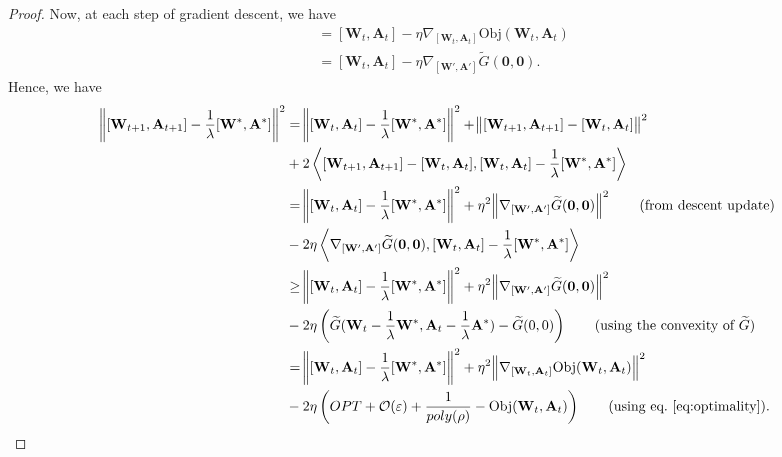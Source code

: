 \begin{proof}
	Now, at each step of gradient descent, we have
	\begin{align*}
		[\mathbf{W}_{t+1}, \mathbf{A}_{t+1}] &= [\mathbf{W}_{t}, \mathbf{A}_{t}] - \eta \nabla_{[\mathbf{W}_{t}, \mathbf{A}_{t}]} \mathrm{Obj}(\mathbf{W}_{t}, \mathbf{A}_{t}) \\&
		= [\mathbf{W}_{t}, \mathbf{A}_{t}] - \eta \nabla_{[\mathbf{W}', \mathbf{A}']} \widetilde{G}(\mathbf{0}, \mathbf{0}) \tag{using the equivalence between gradient derived above}. 
	\end{align*}
	Hence, we have
	\begin{align*}
		\norm{[\mathbf{W}_{t+1}, \mathbf{A}_{t+1}] - \frac{1}{\lambda}[\mathbf{W}^{\ast}, \mathbf{A}^{\ast}]}^2 &= \norm{[\mathbf{W}_{t}, \mathbf{A}_{t}] - \frac{1}{\lambda}[\mathbf{W}^{\ast}, \mathbf{A}^{\ast}]}^2 + \norm{[\mathbf{W}_{t+1}, \mathbf{A}_{t+1}] - [\mathbf{W}_t, \mathbf{A}_t]}^2 \\&+ 2 \left\langle [\mathbf{W}_{t+1}, \mathbf{A}_{t+1}] - [\mathbf{W}_t, \mathbf{A}_t],  [\mathbf{W}_{t}, \mathbf{A}_{t}] - \frac{1}{\lambda}[\mathbf{W}^{\ast}, \mathbf{A}^{\ast}] \right\rangle \\&
		=  \norm{[\mathbf{W}_{t}, \mathbf{A}_{t}] - \frac{1}{\lambda}[\mathbf{W}^{\ast}, \mathbf{A}^{\ast}]}^2 + \eta^2 \norm{\nabla_{[\mathbf{W}', \mathbf{A}']} \widetilde{G}(\mathbf{0}, \mathbf{0})}^2 \tag{from descent update}
		\\& - 2\eta \left\langle\nabla_{[\mathbf{W}', \mathbf{A}']} \widetilde{G}(\mathbf{0}, \mathbf{0}),  [\mathbf{W}_{t}, \mathbf{A}_{t}] - \frac{1}{\lambda}[\mathbf{W}^{\ast}, \mathbf{A}^{\ast}] \right\rangle \\&
		\ge \norm{[\mathbf{W}_{t}, \mathbf{A}_{t}] - \frac{1}{\lambda}[\mathbf{W}^{\ast}, \mathbf{A}^{\ast}]}^2 + \eta^2 \norm{\nabla_{[\mathbf{W}', \mathbf{A}']} \widetilde{G}(\mathbf{0}, \mathbf{0})}^2 \\& - 2\eta \left(\widetilde{G}(\mathbf{W}_t - \frac{1}{\lambda} \mathbf{W}^{\ast}, \mathbf{A}_t - \frac{1}{\lambda} \mathbf{A}^{\ast}) - \widetilde{G}(0, 0)\right) 
		\tag{using the convexity of $\widetilde{G}$}\\&
		= \norm{[\mathbf{W}_{t}, \mathbf{A}_{t}] - \frac{1}{\lambda}[\mathbf{W}^{\ast}, \mathbf{A}^{\ast}]}^2 + \eta^2 \norm{\nabla_{[\mathbf{W}_t, \mathbf{A}_t]} \mathrm{Obj}(\mathbf{W}_t, \mathbf{A}_t)}^2 \\& - 2\eta \left(OPT +\mathcal{O}(\varepsilon) + \frac{1}{poly(\rho)} - \mathrm{Obj}(\mathbf{W}_t, \mathbf{A}_t)\right) \tag{using eq.~\ref{eq:optimality}}.
	\end{align*}

\end{proof}
